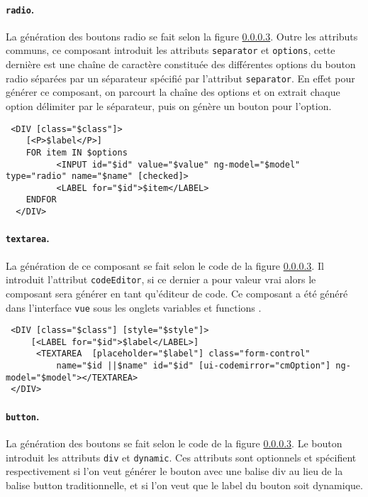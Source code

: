 \documentclass[a4paper,11pt]{report}
\begin{document}
\paragraph{{\tt radio}.} La génération des boutons radio se fait selon la figure \ref{}. Outre les attributs communs, 
ce composant introduit les attributs {\tt separator} et  {\tt options}, cette dernière est une chaîne de caractère constituée des
différentes options du bouton radio séparées par un séparateur spécifié par l'attribut  {\tt separator}. En effet 
pour générer ce composant, on parcourt la chaîne des options et on extrait chaque option délimiter par le séparateur, puis on génère 
un bouton pour l'option. 
\begin{verbatim}
 <DIV [class="$class"]>
	[<P>$label</P>]
	FOR item IN $options
	      <INPUT id="$id" value="$value" ng-model="$model" type="radio" name="$name" [checked]>
	      <LABEL for="$id">$item</LABEL>
	ENDFOR
  </DIV>
\end{verbatim}


\paragraph{{\tt textarea}.} La génération de ce composant se fait selon le code de la figure \ref{}. Il introduit
l'attribut {\tt codeEditor}, si ce dernier a pour valeur \og vrai \fg alors le composant sera générer en tant qu'éditeur
de code. Ce composant a été généré dans l'interface {\tt vue} sous les onglets \og variables \fg et  \og functions \fg .

\begin{verbatim}
 <DIV [class="$class"] [style="$style"]>
     [<LABEL for="$id">$label</LABEL>]
      <TEXTAREA  [placeholder="$label"] class="form-control"
	      name="$id ||$name" id="$id" [ui-codemirror="cmOption"] ng-model="$model"></TEXTAREA>
 </DIV>
\end{verbatim}

\paragraph{{\tt button}.} La génération des boutons se fait selon le code de la figure \ref{}. Le bouton introduit les attributs
{\tt div} et  {\tt dynamic}. Ces attributs sont optionnels et spécifient respectivement si l'on veut générer le bouton avec une 
balise \og div \fg au lieu de la balise \og button \fg traditionnelle, et si l'on veut que le label du bouton soit dynamique.
\end{document}
